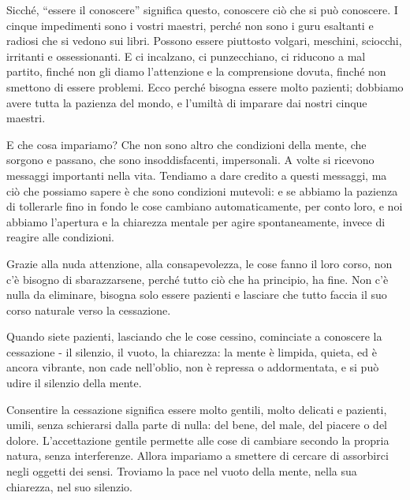 Sicché, “essere il conoscere” significa questo, conoscere ciò che si può
conoscere. I cinque impedimenti sono i vostri maestri, perché non sono i
guru esaltanti e radiosi che si vedono sui libri. Possono essere
piuttosto volgari, meschini, sciocchi, irritanti e ossessionanti. E ci
incalzano, ci punzecchiano, ci riducono a mal partito, finché non gli
diamo l'attenzione e la comprensione dovuta, finché non smettono di
essere problemi. Ecco perché bisogna essere molto pazienti; dobbiamo
avere tutta la pazienza del mondo, e l'umiltà di imparare dai nostri
cinque maestri.

E che cosa impariamo? Che non sono altro che condizioni della mente, che
sorgono e passano, che sono insoddisfacenti, impersonali. A volte si
ricevono messaggi importanti nella vita. Tendiamo a dare credito a
questi messaggi, ma ciò che possiamo sapere è che sono condizioni
mutevoli: e se abbiamo la pazienza di tollerarle fino in fondo le cose
cambiano automaticamente, per conto loro, e noi abbiamo l'apertura e la
chiarezza mentale per agire spontaneamente, invece di reagire alle
condizioni.

Grazie alla nuda attenzione, alla consapevolezza, le cose fanno il loro
corso, non c'è bisogno di sbarazzarsene, perché tutto ciò che ha
principio, ha fine. Non c'è nulla da eliminare, bisogna solo essere
pazienti e lasciare che tutto faccia il suo corso naturale verso la
cessazione.

Quando siete pazienti, lasciando che le cose cessino, cominciate a
conoscere la cessazione - il silenzio, il vuoto, la chiarezza: la mente
è limpida, quieta, ed è ancora vibrante, non cade nell'oblio, non è
repressa o addormentata, e si può udire il silenzio della mente.

Consentire la cessazione significa essere molto gentili, molto delicati
e pazienti, umili, senza schierarsi dalla parte di nulla: del bene, del
male, del piacere o del dolore. L'accettazione gentile permette alle
cose di cambiare secondo la propria natura, senza interferenze. Allora
impariamo a smettere di cercare di assorbirci negli oggetti dei sensi.
Troviamo la pace nel vuoto della mente, nella sua chiarezza, nel suo
silenzio.


